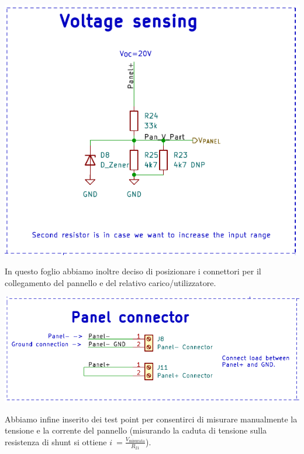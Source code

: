 \begin{center}
\includegraphics[scale=0.7]{figures/image62.png}
\captionsetup{type=figure}
\end{center}

\noindent In questo foglio abbiamo inoltre deciso di posizionare i connettori per
il collegamento del pannello e del relativo carico/utilizzatore.

\begin{center}
\includegraphics[scale=0.8]{figures/image48.png}
\captionsetup{type=figure}
\end{center}

\noindent Abbiamo infine inserito dei test point per consentirci di misurare
manualmente la tensione e la corrente del pannello (misurando la caduta
di tensione sulla resistenza di shunt si ottiene
\(i\  = \frac{V_{\text{misurata}}}{R_{21}}\)).

